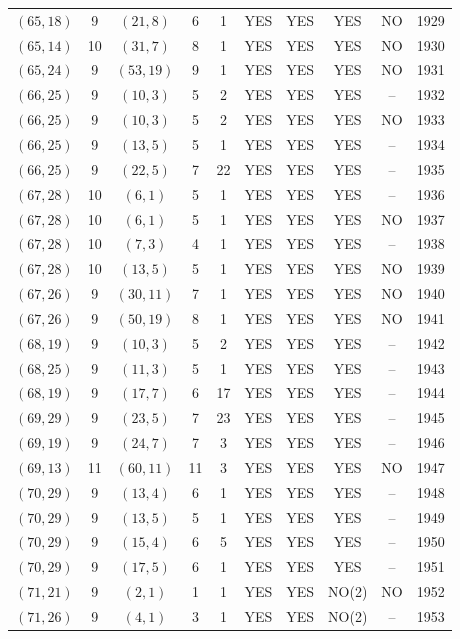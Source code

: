 \begin{longtable}{|c|c|c|c|c|c|c|c|c|c|}
$(65, 18)$ & 9 & $(21, 8)$ & 6 & 1 & YES & YES & YES & NO & 1929\\
$(65, 14)$ & 10 & $(31, 7)$ & 8 & 1 & YES & YES & YES & NO & 1930\\
$(65, 24)$ & 9 & $(53, 19)$ & 9 & 1 & YES & YES & YES & NO & 1931\\
$(66, 25)$ & 9 & $(10, 3)$ & 5 & 2 & YES & YES & YES & -- & 1932\\
$(66, 25)$ & 9 & $(10, 3)$ & 5 & 2 & YES & YES & YES & NO & 1933\\
$(66, 25)$ & 9 & $(13, 5)$ & 5 & 1 & YES & YES & YES & -- & 1934\\
$(66, 25)$ & 9 & $(22, 5)$ & 7 & 22 & YES & YES & YES & -- & 1935\\
$(67, 28)$ & 10 & $(6, 1)$ & 5 & 1 & YES & YES & YES & -- & 1936\\
$(67, 28)$ & 10 & $(6, 1)$ & 5 & 1 & YES & YES & YES & NO & 1937\\
$(67, 28)$ & 10 & $(7, 3)$ & 4 & 1 & YES & YES & YES & -- & 1938\\
$(67, 28)$ & 10 & $(13, 5)$ & 5 & 1 & YES & YES & YES & NO & 1939\\
$(67, 26)$ & 9 & $(30, 11)$ & 7 & 1 & YES & YES & YES & NO & 1940\\
$(67, 26)$ & 9 & $(50, 19)$ & 8 & 1 & YES & YES & YES & NO & 1941\\
$(68, 19)$ & 9 & $(10, 3)$ & 5 & 2 & YES & YES & YES & -- & 1942\\
$(68, 25)$ & 9 & $(11, 3)$ & 5 & 1 & YES & YES & YES & -- & 1943\\
$(68, 19)$ & 9 & $(17, 7)$ & 6 & 17 & YES & YES & YES & -- & 1944\\
$(69, 29)$ & 9 & $(23, 5)$ & 7 & 23 & YES & YES & YES & -- & 1945\\
$(69, 19)$ & 9 & $(24, 7)$ & 7 & 3 & YES & YES & YES & -- & 1946\\
$(69, 13)$ & 11 & $(60, 11)$ & 11 & 3 & YES & YES & YES & NO & 1947\\
$(70, 29)$ & 9 & $(13, 4)$ & 6 & 1 & YES & YES & YES & -- & 1948\\
$(70, 29)$ & 9 & $(13, 5)$ & 5 & 1 & YES & YES & YES & -- & 1949\\
$(70, 29)$ & 9 & $(15, 4)$ & 6 & 5 & YES & YES & YES & -- & 1950\\
$(70, 29)$ & 9 & $(17, 5)$ & 6 & 1 & YES & YES & YES & -- & 1951\\
$(71, 21)$ & 9 & $(2, 1)$ & 1 & 1 & YES & YES & NO(2) & NO & 1952\\
$(71, 26)$ & 9 & $(4, 1)$ & 3 & 1 & YES & YES & NO(2) & -- & 1953\\

\end{longtable}
